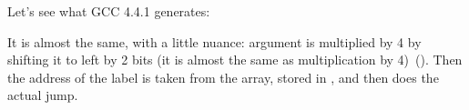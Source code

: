 

\label{switch_lot_GCC}

Let's see what GCC 4.4.1 generates:




It is almost the same, with a little nuance: argument  is multiplied by 4 by
shifting it to left by 2 bits (it is almost the same as multiplication by 4)~().
Then the address of the label is taken from the  array, stored in 
\EAX, and then  does the actual jump.

